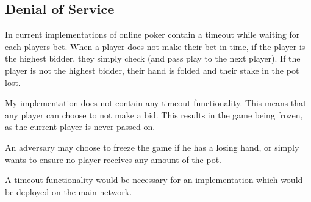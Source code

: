 \subsection{Denial of Service}

In current implementations of online poker contain a timeout while waiting for each players bet. When a player does not make their bet in time, if the player is the highest bidder, they simply check (and pass play to the next player). If the player is not the highest bidder, their hand is folded and their stake in the pot lost.

My implementation does not contain any timeout functionality. This means that any player can choose to not make a bid. This results in the game being frozen, as the current player is never passed on.

An adversary may choose to freeze the game if he has a losing hand, or simply wants to ensure no player receives any amount of the pot.

A timeout functionality would be necessary for an implementation which would be deployed on the main network.